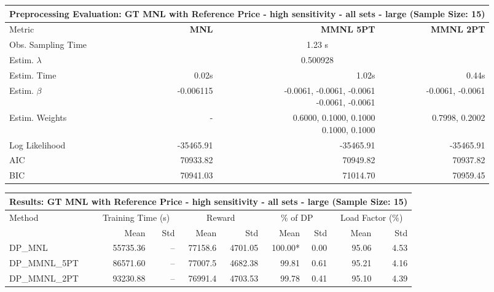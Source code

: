 
\begin{samepage}
\begin{center}
  \small
  \begin{tabular}{l|r|r|r}
    \toprule
    \multicolumn{4}{c}{\textbf{Preprocessing Evaluation: GT MNL with Reference Price - high sensitivity - all sets - large (Sample Size: 15)}} \\
    \midrule
    Metric & \textbf{MNL} & \textbf{MMNL 5PT} & \textbf{MMNL 2PT} \\
    \midrule
    Obs. Sampling Time & \multicolumn{3}{c}{1.23 s} \\
    Estim. $\lambda$ & \multicolumn{3}{c}{0.500928} \\
    Estim. Time & 0.02s & 1.02s & 0.44s \\
    Estim. $\beta$ & -0.006115 & \makecell[tr]{-0.0061, -0.0061, -0.0061 \\ -0.0061, -0.0061} & -0.0061, -0.0061 \\
    Estim. Weights & - & \makecell[tr]{0.6000, 0.1000, 0.1000 \\ 0.1000, 0.1000} & 0.7998, 0.2002 \\
    Log Likelihood & -35465.91 & -35465.91 & -35465.91 \\
    AIC & 70933.82 & 70949.82 & 70937.82 \\
    BIC & 70941.03 & 71014.70 & 70959.45 \\
    \bottomrule
  \end{tabular}
\end{center}
\begin{center}
  \small
  \begin{tabular}{l|rr|rr|rr|rr}
    \toprule
    \multicolumn{9}{c}{\textbf{Results: GT MNL with Reference Price - high sensitivity - all sets - large (Sample Size: 15)}} \\
    \midrule
    Method & \multicolumn{2}{c|}{Training Time (s)} & \multicolumn{2}{c|}{Reward} & \multicolumn{2}{c|}{\% of DP} & \multicolumn{2}{c}{Load Factor (\%)} \\
    & Mean & Std & Mean & Std & Mean & Std & Mean & Std \\
    \midrule
    DP\_MNL      & 55735.36 &    -- &    77158.6 &    4701.05 & 100.00* &    0.00 &   95.06 &    4.53 \\
    DP\_MMNL\_5PT & 86571.60 &    -- &    77007.5 &    4682.38 &   99.81 &    0.61 &   95.21 &    4.16 \\
    DP\_MMNL\_2PT & 93230.88 &    -- &    76991.4 &    4703.53 &   99.78 &    0.41 &   95.10 &    4.39 \\

\end{tabular}
\end{center}
\end{samepage}
